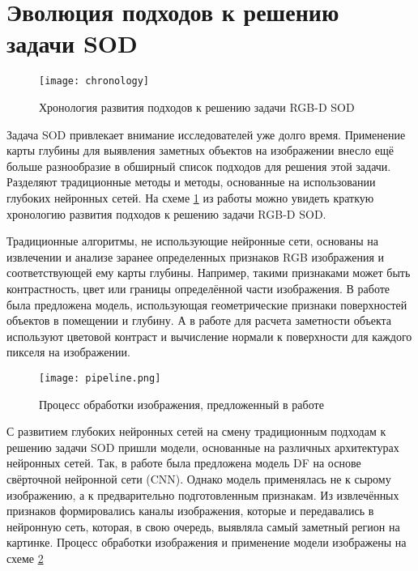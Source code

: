 \section{Эволюция подходов к решению задачи SOD}

\begin{figure}
    \centering
    \texttt{[image: chronology]}
    \caption{Хронология развития подходов к решению задачи RGB-D SOD}
    \label{fig:chronology}
\end{figure}

Задача SOD привлекает внимание исследователей уже долго время. Применение карты глубины для выявления заметных объектов на изображении 
внесло ещё больше разнообразие в обширный список подходов для решения этой задачи. Разделяют традиционные методы и методы, основанные 
на использовании глубоких нейронных сетей. На схеме \ref{fig:chronology} из работы \cite{Survey} можно увидеть краткую хронологию развития
подходов к решению задачи RGB-D SOD.


Традиционные алгоритмы, не использующие нейронные сети, основаны на извлечении и анализе заранее определенных признаков RGB изображения и соответствующей ему карты глубины.
Например, такими признаками может быть контрастность, цвет или границы определённой части изображения. 
В работе \cite{Depth-really-Matters} была предложена модель, использующая геометрические признаки поверхностей объектов в помещении и глубину. 
А в работе \cite{Depth-View-of-Saliency} для расчета заметности объекта используют цветовой контраст и вычисление нормали к поверхности\cite{Surface-Normal} для каждого пикселя на изображении.

\begin{figure}
    \centering
    \texttt{[image: pipeline.png]}
    \caption{Процесс обработки изображения, предложенный в работе \cite{RGBD-SOD-Deep-Fusion}}
    \label{fig:pipeline}
\end{figure}

С развитием глубоких нейронных сетей на смену традиционным подходам к решению задачи SOD пришли модели, основанные на различных архитектурах нейронных сетей.
Так, в работе \cite{RGBD-SOD-Deep-Fusion} была предложена модель DF на основе свёрточной нейронной сети (CNN). Однако модель применялась не к сырому изображению, 
а к предварительно подготовленным признакам. Из извлечённых признаков формировались каналы изображения, которые и передавались в нейронную сеть, которая, в свою очередь,
выявляла самый заметный регион на картинке. Процесс обработки изображения и применение модели изображены на схеме \ref{fig:pipeline}


